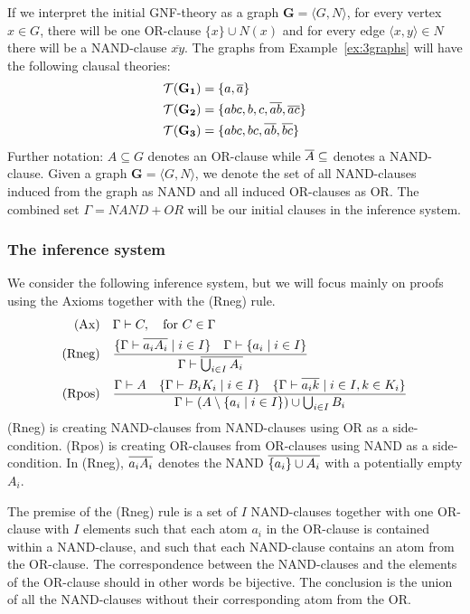If we interpret the initial GNF-theory as a graph $\mathbf{G}=\langle G,N\rangle$, for every vertex $x \in G$, there will be one OR-clause $\{ x \} \cup N(x)$ and for every edge $\langle x,y \rangle \in N$ there will be a NAND-clause $\overline{xy}$.
The graphs from Example~\ref{ex:3graphs} will have the following clausal theories:
\begin{align}
  \mathcal{T}(\mathbf{G_1}) &= \{ a, \overline{a} \}\\
  \mathcal{T}(\mathbf{G_2}) &= \{ abc, b, c, \overline{ab}, \overline{ac} \}\\
  \mathcal{T}(\mathbf{G_3}) &= \{ abc, bc, \overline{ab}, \overline{bc} \}
\end{align}
Further notation: $A\subseteq G$ denotes an OR-clause while $\overline{A} \subseteq$ denotes a NAND-clause.
Given a graph $\mathbf{G}=\langle G,N\rangle$, we denote the set of all NAND-clauses induced from the graph as NAND and all induced OR-clauses as OR.
The combined set $\Gamma = NAND + OR$ will be our initial clauses in the inference system.
\subsubsection{The inference system}
\label{subs:The inference system}
We consider the following inference system, but we will focus mainly on proofs using the Axioms together with the (Rneg) rule.
\begin{align}
  \text{(Ax)} &\quad \Gamma \vdash C, \quad \text{for } C \in \Gamma\\
  \text{(Rneg)} &\quad \frac{ \{ \Gamma \vdash \overline{a_iA_i} \; |\; i \in I \} \quad \Gamma \vdash \{ a_i \; |\; i \in I \} }{ \Gamma \vdash \overline{\bigcup_{i \in I} A_i} }\\
  \text{(Rpos)} &\quad \frac{ \Gamma \vdash A \quad \{\Gamma \vdash B_iK_i \; |\; i \in I \} \quad \{ \Gamma \vdash \overline{a_ik} \; |\; i \in I, k \in K_i \} }{ \Gamma \vdash (A \setminus \{ a_i \; |\; i \in I \} ) \cup \bigcup_{i \in I} B_i }
\end{align}
(Rneg) is creating NAND-clauses from NAND-clauses using OR as a side-condition.
(Rpos) is creating OR-clauses from OR-clauses using NAND as a side-condition.
In (Rneg), $\overline{a_iA_i}$ denotes the NAND $\overline{\{ a_i \} \cup A_i}$ with a potentially empty $A_i$.

The premise of the (Rneg) rule is a set of $I$ NAND-clauses together with one OR-clause with $I$ elements such that each atom $a_i$ in the OR-clause is contained within a NAND-clause, and such that each NAND-clause contains an atom from the OR-clause.
The correspondence between the NAND-clauses and the elements of the OR-clause should in other words be bijective.
The conclusion is the union of all the NAND-clauses without their corresponding atom from the OR.

